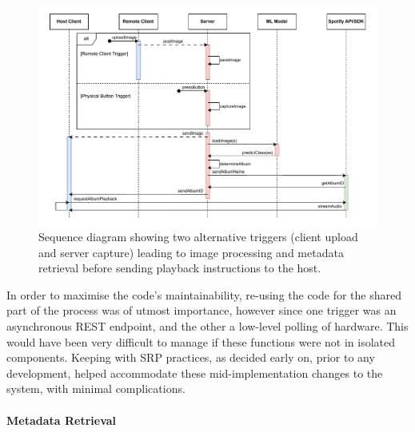             \begin{figure}[h]
                \centering
                \includegraphics[width=\textwidth]{images/VTT_imageScan.SequenceDiagram.pdf}
                \caption{Sequence diagram showing two alternative triggers (client upload and server capture) leading to image processing and metadata retrieval before sending playback instructions to the host.}
                \label{fig:imageSequenceDiagram}
            \end{figure}
    
            In order to maximise the code's maintainability, re-using the code for the shared part of the process was of utmost importance, however since one trigger was an asynchronous REST endpoint, and the other a low-level polling of hardware. This would have been very difficult to manage if these functions were not in isolated components. Keeping with SRP practices, as decided early on, prior to any development, helped accommodate these mid-implementation changes to the system, with minimal complications.
    
            \paragraph{Metadata Retrieval}
    
